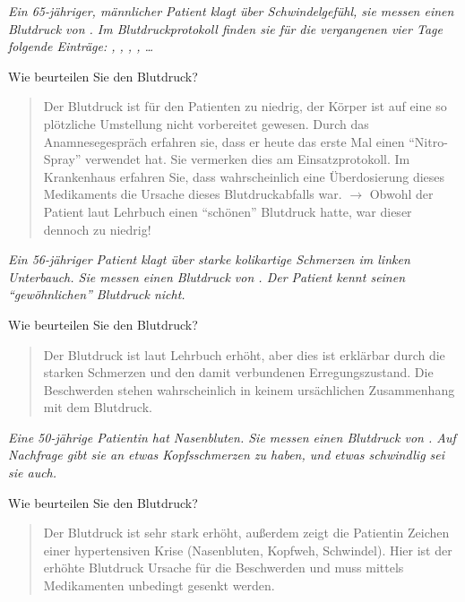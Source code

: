 
\emph{Ein 65-jähriger, männlicher Patient klagt über
Schwindelgefühl, sie messen einen Blutdruck von
. Im Blutdruckprotokoll finden sie für die
vergangenen vier Tage folgende Einträge:
, , , , \ldots}


Wie beurteilen Sie den Blutdruck?

\begin{quote}
Der Blutdruck ist für den Patienten zu niedrig, der Körper
ist auf eine so plötzliche Umstellung nicht vorbereitet
gewesen. Durch das Anamnesegespräch erfahren sie, dass er
heute das erste Mal einen \enquote{Nitro-Spray} verwendet hat. Sie
vermerken dies am Einsatzprotokoll. Im Krankenhaus erfahren
Sie, dass wahrscheinlich eine Überdosierung dieses
Medikaments die Ursache dieses Blutdruckabfalls war.
${\rightarrow}$ Obwohl der Patient laut Lehrbuch einen
\enquote{schönen} Blutdruck hatte, war dieser dennoch zu niedrig!
\end{quote}

\emph{Ein 56-jähriger Patient klagt über starke kolikartige
Schmerzen im linken Unterbauch. Sie messen einen Blutdruck
von . Der Patient kennt seinen
\enquote{gewöhnlichen} Blutdruck
nicht.}  

Wie beurteilen Sie den Blutdruck?

\begin{quote}
Der Blutdruck ist laut Lehrbuch erhöht, aber dies ist
erklärbar durch die starken Schmerzen und den damit
verbundenen Erregungszustand. Die Beschwerden stehen
wahrscheinlich in
keinem ursächlichen Zusammenhang mit dem Blutdruck.
\end{quote}

\emph{Eine 50-jährige Patientin hat Nasenbluten. Sie
messen einen Blutdruck von . Auf Nachfrage gibt sie an
etwas Kopfsschmerzen zu haben, und etwas schwindlig sei sie auch.} 

Wie beurteilen Sie den Blutdruck? 

\begin{quote}
Der Blutdruck ist sehr stark erhöht, außerdem zeigt die
Patientin Zeichen einer hypertensiven Krise (Nasenbluten,
Kopfweh, Schwindel).
Hier ist der erhöhte Blutdruck Ursache für die Beschwerden
und muss mittels Medikamenten unbedingt gesenkt werden.
\end{quote}


